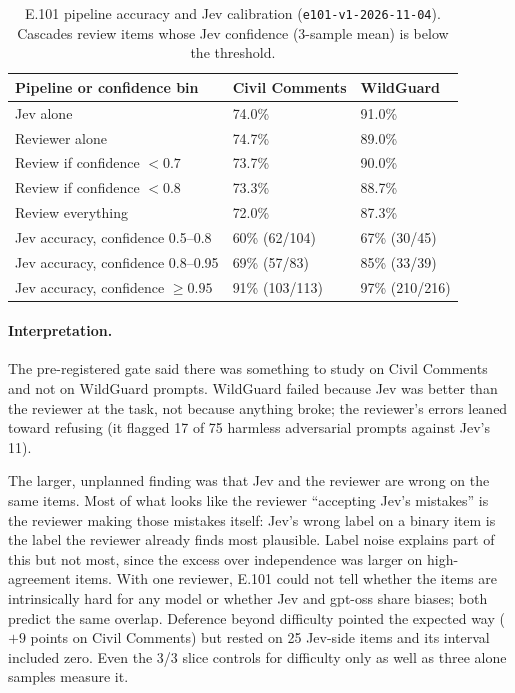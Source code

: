 \documentclass[11pt]{article}
\renewcommand{\_}{\origunderscore\allowbreak}
\begin{document}
\begin{table}[H]
\centering
\small
\caption{E.101 pipeline accuracy and Jev calibration (\texttt{e101-v1-2026-11-04}). Cascades review items whose Jev confidence (3-sample mean) is below the threshold.}
\label{tab:e101-pipelines}
\begin{tabular}{l l l}
\toprule
Pipeline or confidence bin & Civil Comments & WildGuard \\
\midrule
Jev alone & 74.0\% & 91.0\% \\
Reviewer alone & 74.7\% & 89.0\% \\
Review if confidence $< 0.7$ & 73.7\% & 90.0\% \\
Review if confidence $< 0.8$ & 73.3\% & 88.7\% \\
Review everything & 72.0\% & 87.3\% \\
\midrule
Jev accuracy, confidence 0.5--0.8 & 60\% (62/104) & 67\% (30/45) \\
Jev accuracy, confidence 0.8--0.95 & 69\% (57/83) & 85\% (33/39) \\
Jev accuracy, confidence $\geq 0.95$ & 91\% (103/113) & 97\% (210/216) \\
\bottomrule
\end{tabular}
\end{table}

\paragraph{Interpretation.}
The pre-registered gate said there was something to study on Civil Comments and not on WildGuard prompts. WildGuard failed because Jev was better than the reviewer at the task, not because anything broke; the reviewer's errors leaned toward refusing (it flagged 17 of 75 harmless adversarial prompts against Jev's 11).

The larger, unplanned finding was that Jev and the reviewer are wrong on the same items. Most of what looks like the reviewer ``accepting Jev's mistakes'' is the reviewer making those mistakes itself: Jev's wrong label on a binary item is the label the reviewer already finds most plausible. Label noise explains part of this but not most, since the excess over independence was larger on high-agreement items. With one reviewer, E.101 could not tell whether the items are intrinsically hard for any model or whether Jev and gpt-oss share biases; both predict the same overlap. Deference beyond difficulty pointed the expected way ($+9$ points on Civil Comments) but rested on 25 Jev-side items and its interval included zero. Even the 3/3 slice controls for difficulty only as well as three alone samples measure it.
\end{document}
